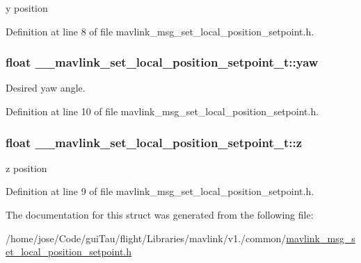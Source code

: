 y position 



Definition at line 8 of file mavlink\-\_\-msg\-\_\-set\-\_\-local\-\_\-position\-\_\-setpoint.\-h.

\hypertarget{struct____mavlink__set__local__position__setpoint__t_a022369221a1eb9e8cf5ef00b75cf7961}{
\subsubsection[{yaw}]{\setlength{\rightskip}{0pt plus 5cm}float \-\_\-\-\_\-mavlink\-\_\-set\-\_\-local\-\_\-position\-\_\-setpoint\-\_\-t\-::yaw}}\label{struct____mavlink__set__local__position__setpoint__t_a022369221a1eb9e8cf5ef00b75cf7961}


Desired yaw angle. 



Definition at line 10 of file mavlink\-\_\-msg\-\_\-set\-\_\-local\-\_\-position\-\_\-setpoint.\-h.

\hypertarget{struct____mavlink__set__local__position__setpoint__t_af83bc511f32cca92e4f66a2963ddc158}{
\subsubsection[{z}]{\setlength{\rightskip}{0pt plus 5cm}float \-\_\-\-\_\-mavlink\-\_\-set\-\_\-local\-\_\-position\-\_\-setpoint\-\_\-t\-::z}}\label{struct____mavlink__set__local__position__setpoint__t_af83bc511f32cca92e4f66a2963ddc158}


z position 



Definition at line 9 of file mavlink\-\_\-msg\-\_\-set\-\_\-local\-\_\-position\-\_\-setpoint.\-h.



The documentation for this struct was generated from the following file\-:\begin{DoxyCompactItemize}
\item 
/home/jose/\-Code/gui\-Tau/flight/\-Libraries/mavlink/v1./common/\hyperlink{mavlink__msg__set__local__position__setpoint_8h}{mavlink\-\_\-msg\-\_\-set\-\_\-local\-\_\-position\-\_\-setpoint.\-h}\end{DoxyCompactItemize}
